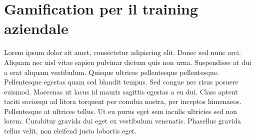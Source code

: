 \chapter{Gamification per il training aziendale}
\label{cha:conclusioni}
Lorem ipsum dolor sit amet, consectetur adipiscing elit. Donec sed nunc orci. Aliquam nec nisl vitae sapien pulvinar dictum quis non urna. Suspendisse at dui a erat aliquam vestibulum. Quisque ultrices pellentesque pellentesque. Pellentesque egestas quam sed blandit tempus. Sed congue nec risus posuere euismod. Maecenas ut lacus id mauris sagittis egestas a eu dui. Class aptent taciti sociosqu ad litora torquent per conubia nostra, per inceptos himenaeos. Pellentesque at ultrices tellus. Ut eu purus eget sem iaculis ultricies sed non lorem. Curabitur gravida dui eget ex vestibulum venenatis. Phasellus gravida tellus velit, non eleifend justo lobortis eget.
